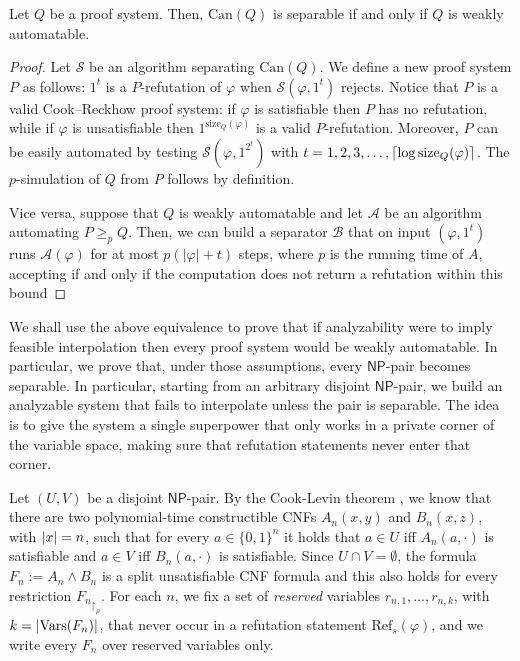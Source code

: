 \begin{proposition}
    Let $Q$ be a proof system. Then, $\mathrm{Can}(Q)$ is separable if and only if $Q$ is weakly automatable.
\end{proposition}

\begin{proof}
    Let $\mathcal{S}$ be an algorithm separating $\mathrm{Can}(Q)$. We define a new proof system $P$ as follows: $1^t$ is a $P$-refutation of $\varphi$ when $\mathcal{S}(\varphi, 1^t)$ rejects. Notice that $P$ is a valid Cook--Reckhow proof system: if $\varphi$ is satisfiable then $P$ has no refutation, while if $\varphi$ is unsatisfiable then $1^{\mathrm{size}_Q(\varphi)}$ is a valid $P$-refutation. Moreover, $P$ can be easily automated by testing $\mathcal{S}(\varphi, 1^{2^t})$ with $t = 1, 2, 3, \ldots, \left \lceil \log \mathrm{size}_Q(\varphi) \right \rceil$. The $p$-simulation of $Q$ from $P$ follows by definition.

    Vice versa, suppose that $Q$ is weakly automatable and let $\mathcal{A}$ be an algorithm automating $P \geq_p Q$. Then, we can build a separator $\mathcal{B}$ that on input $(\varphi, 1^t)$ runs $\mathcal{A}(\varphi)$ for at most $p(|\varphi| + t)$ steps, where $p$ is the running time of $A$, accepting if and only if the computation does not return a refutation within this bound
\end{proof}

We shall use the above equivalence to prove that if analyzability were to imply feasible interpolation then every proof system would be weakly automatable. In particular, we prove that, under those assumptions, every $\mathsf{NP}$-pair becomes separable. In particular, starting from an arbitrary disjoint $\mathsf{NP}$-pair, we build an analyzable system that fails to interpolate unless the pair is separable. The idea is to give the system a single superpower that only works in a private corner of the variable space, making sure that refutation statements never enter that corner.

Let $(U,V)$ be a disjoint $\mathsf{NP}$-pair. By the Cook-Levin theorem \cite{cook_sat,levin_fsat,arora_barak}, we know that there are two polynomial-time constructible CNFs $A_n(x,y)$ and $B_n(x,z)$, with $\left|x\right|=n$, such that for every $a \in\{0,1\}^n$ it holds that $a \in U$ iff $A_n(a,\cdot)$ is satisfiable and $a \in V$ iff $B_n(a,\cdot)$ is satisfiable. Since $U\cap V=\emptyset$, the formula $F_n:=A_n\land B_n$ is a split unsatisfiable CNF formula and this also holds for every restriction ${F_n}_{\upharpoonright_\rho}$. For each $n$, we fix a set of \emph{reserved} variables $r_{n,1}, \ldots, r_{n,k}$, with $k = |\mathrm{Vars}(F_n)|$, that never occur in a refutation statement $\mathrm{Ref}_s(\varphi)$, and we write every $F_n$ over reserved variables only.

